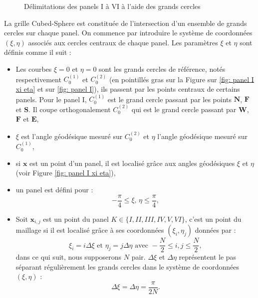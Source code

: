 \begin{figure}[htbp]
\begin{center}
\end{center}
\caption{Délimitations des panels I à VI à l'aide des grands cercles}
\label{fig: panel I to VI}
\end{figure}

La grille Cubed-Sphere est constituée de l'intersection d'un ensemble de grands cercles sur chaque panel. On commence par introduire le système de coordonnées $(\xi,\eta)$ associés aux cercles centraux de chaque panel. Les paramètres $\xi$ et  $\eta$ sont définis comme il suit :

\begin{itemize}
\item Les courbes $\xi = 0$ et $\eta = 0$ sont les grands cercles de référence, notés respectivement $C_0^{(1)}$ et $C_0^{(2)}$ (en pointillés gras sur la Figure sur \ref{fig: panel I xi eta} et sur \ref{fig: panel I}), ils passent par les points centraux de certains panels. Pour le panel I, $C_0^{(1)}$ est le grand cercle passant par les points $\mathbf{N}$, $\mathbf{F}$ et $\mathbf{S}$. Il coupe orthogonalement $C_0^{(2)}$ qui est le grand cercle passant par $\mathbf{W}$, $\mathbf{F}$ et $\mathbf{E}$,

\item $\xi$ est l'angle géodésique mesuré sur $C_0^{(2)}$ et $\eta$ l'angle géodésique mesuré sur $C_0^{(1)}$,

\item si $\mathbf{x}$ est un point d'un panel, il est localisé grâce aux angles géodésiques $\xi$ et $\eta$  (voir Figure \ref{fig: panel I xi eta}),

\item un panel est défini pour :
\begin{equation}
- \dfrac{\pi}{4} \leq \xi\text{, }\eta \leq \dfrac{\pi}{4},
\end{equation}

\item Soit $\mathbf{x}_{i,j}$ est un point du panel $K \in \lbrace I, II, III, IV, V, VI \rbrace$, c'est un point du maillage si il est localisé grâce à ses coordonnées $(\xi_i, \eta_j)$ données par :
\begin{equation}
\xi_i = i \Delta \xi \text{ et } \eta_j = j \Delta \eta \text{ avec } -\dfrac{N}{2} \leq i,j \leq \dfrac{N}{2},
\end{equation}
dans ce qui suit, nous supposerons $N$ pair. $\Delta \xi$ et $\Delta \eta$ représentent le pas séparant régulièrement les grands cercles dans le système de coordonnées $(\xi, \eta)$ :
\begin{equation}
\Delta \xi = \Delta \eta = \dfrac{\pi}{2N}.
\end{equation} 
\end{itemize}

